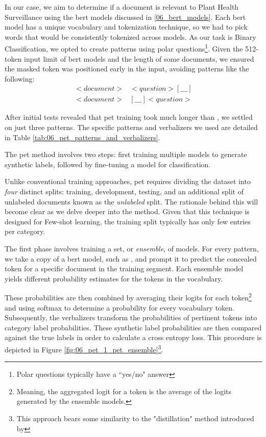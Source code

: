 In our case, we aim to determine if a document is relevant to Plant Health Surveillance using the \gls{bert} models discussed in \headerName{} \ref{06_bert_models}. 
Each \gls{bert} model has a unique vocabulary and tokenization technique, so we had to pick words that would be consistently tokenized across models. 
As our task is Binary Classification, we opted to create patterns using polar questions\footnote{Polar questions typically have a ``yes/no" answer}.
Given the 512-token input limit of \gls{bert} models and the length of some documents, we ensured the masked token was positioned early in the input, avoiding patterns like the following:
\begin{align*}
  <document>&<question> [\_\_\_] \\
  <document>& [\_\_\_] <question>
\end{align*}


After initial tests revealed that \gls{pet} training took much longer than \finetuning{}, we settled on just three patterns. The specific patterns and verbalizers we used are detailed in Table \ref{tab:06_pet_patterns_and_verbalizers}.



The \gls{pet} method involves two steps: first training multiple models to generate synthetic labels, followed by fine-tuning a model for classification.

Unlike conventional training approaches, \gls{pet} requires dividing the dataset into \emph{four} distinct splits: training, development, testing, and an additional split of unlabeled documents known as the \emph{unlabeled} split. The rationale behind this will become clear as we delve deeper into the method. Given that this technique is designed for Few-shot learning, the training split typically has only few entries per category.

The first phase involves training a set, or \emph{ensemble}, of models. For every pattern, we take a copy of a \gls{bert} model, such as \bertmultilingual{}, and prompt it to predict the concealed token for a specific document in the training segment. Each ensemble model yields different probability estimates for the tokens in the vocabulary.

These probabilities are then combined by averaging their logits for each token\footnote{Meaning, the aggregated logit for a token is the average of the logits generated by the ensemble models.} and using \gls{softmax} to determine a probability for every vocabulary token.
Subsequently, the verbalizers transform the probabilities of pertinent tokens into category label probabilities. 
These synthetic label probabilities are then compared against the true labels in order to calculate a cross entropy loss.
This procedure is depicted in Figure \ref{fig:06_pet_1_pet_ensemble}\footnote{This approach bears some similarity to the "distillation" method introduced by }.


